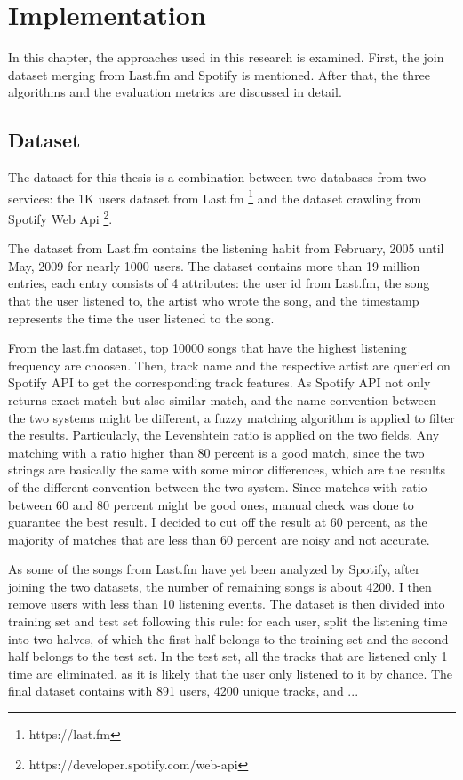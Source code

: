 \chapter{Implementation} %

\label{Chapter3} %

In this chapter, the approaches used in this research is examined. First, the join dataset merging from Last.fm and Spotify is mentioned. After that, the three algorithms and the evaluation metrics are discussed in detail.

\section{Dataset}

The dataset for this thesis is a combination between two databases from two services: the 1K users dataset from Last.fm \footnote{https://last.fm} and the dataset crawling from Spotify Web Api \footnote{https://developer.spotify.com/web-api}. 

The dataset from Last.fm contains the listening habit from February, 2005 until May, 2009 for nearly 1000 users. The dataset contains more than 19 million entries, each entry consists of 4 attributes: the user id from Last.fm, the song that the user listened to, the artist who wrote the song, and the timestamp represents the time the user listened to the song. 

From the last.fm dataset, top 10000 songs that have the highest listening frequency are choosen. Then, track name and the respective artist are queried on Spotify API to get the corresponding track features. As Spotify API not only returns exact match but also similar match, and the name convention between the two systems might be different, a fuzzy matching algorithm is applied to filter the results. Particularly, the Levenshtein ratio is applied on the two fields. Any matching with a ratio higher than 80 percent is a good match, since the two strings are basically the same with some minor differences, which are the results of the different convention between the two system. Since matches with ratio between 60 and 80 percent might be good ones, manual check was done to guarantee the best result. I decided to cut off the result at 60 percent, as the majority of matches that are less than 60 percent are noisy and not accurate.

As some of the songs from Last.fm have yet been analyzed by Spotify, after joining the two datasets, the number of remaining songs is about 4200. I then remove users with less than 10 listening events.
The dataset is then divided into training set and test set following this rule: for each user, split the listening time into two halves, of which the first half belongs to the training set and the second half belongs to the test set. In the test set, all the tracks that are listened only 1 time are eliminated, as it is likely that the user only listened to it by chance. The final dataset contains with 891 users, 4200 unique tracks, and ...

